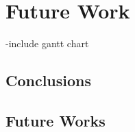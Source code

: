 \chapter{Future Work}
\label{futureWork}

-include gantt chart

\section{Conclusions}

\section{Future Works}